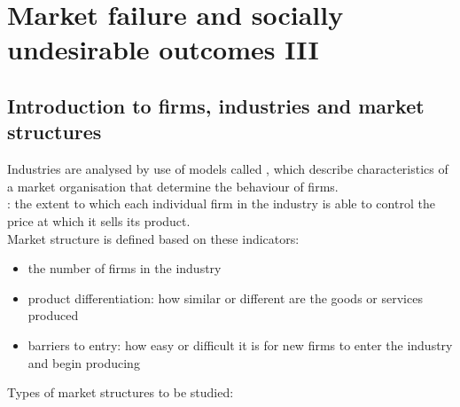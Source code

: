 \section{Market failure and socially undesirable outcomes III}
\subsection{Introduction to firms, industries and market structures}
Industries are analysed by use of models called , which describe characteristics of a market organisation that determine the behaviour of firms.
\\: the extent to which each individual firm in the industry is able to control the price at which it sells its product.\\
Market structure is defined based on these indicators:
\begin{itemize}
  \item the number of firms in the industry
  \item product differentiation: how similar or different are the goods or services produced
  \item barriers to entry: how easy or difficult it is for new firms to enter the industry and begin producing
\end{itemize}
Types of market structures to be studied:
